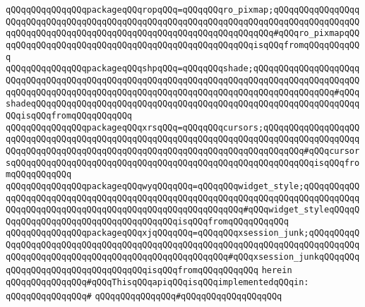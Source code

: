 \verb|qQQqqQQqqQQqqQQqpackageqQQqropqQQq=qQQqqQQqro_pixmap;qQQqqQQqqQQqqQQqqQQqqQQqqQQqqQQqqQQqqQQqqQQqqQQqqQQqqQQqqQQqqQQqqQQqqQQqqQQqqQQqqQQqqQQqqQQqqQQqqQQqqQQqqQQqqQQqqQQqqQQqqQQqqQQqqQQqqQQqqQQq#qQQqro_pixmapqQQqqQQqqQQqqQQqqQQqqQQqqQQqqQQqqQQqqQQqqQQqqQQqqQQqisqQQqfromqQQqqQQqqQQq|\newline
\verb|qQQqqQQqqQQqqQQqpackageqQQqshpqQQq=qQQqqQQqshade;qQQqqQQqqQQqqQQqqQQqqQQqqQQqqQQqqQQqqQQqqQQqqQQqqQQqqQQqqQQqqQQqqQQqqQQqqQQqqQQqqQQqqQQqqQQqqQQqqQQqqQQqqQQqqQQqqQQqqQQqqQQqqQQqqQQqqQQqqQQqqQQqqQQqqQQqqQQq#qQQqshadeqQQqqQQqqQQqqQQqqQQqqQQqqQQqqQQqqQQqqQQqqQQqqQQqqQQqqQQqqQQqqQQqqQQqisqQQqfromqQQqqQQqqQQq|\newline
\verb|qQQqqQQqqQQqqQQqpackageqQQqxrsqQQq=qQQqqQQqcursors;qQQqqQQqqQQqqQQqqQQqqQQqqQQqqQQqqQQqqQQqqQQqqQQqqQQqqQQqqQQqqQQqqQQqqQQqqQQqqQQqqQQqqQQqqQQqqQQqqQQqqQQqqQQqqQQqqQQqqQQqqQQqqQQqqQQqqQQqqQQqqQQqqQQq#qQQqcursorsqQQqqQQqqQQqqQQqqQQqqQQqqQQqqQQqqQQqqQQqqQQqqQQqqQQqqQQqqQQqisqQQqfromqQQqqQQqqQQq|\newline
\verb|qQQqqQQqqQQqqQQqpackageqQQqwyqQQqqQQq=qQQqqQQqwidget_style;qQQqqQQqqQQqqQQqqQQqqQQqqQQqqQQqqQQqqQQqqQQqqQQqqQQqqQQqqQQqqQQqqQQqqQQqqQQqqQQqqQQqqQQqqQQqqQQqqQQqqQQqqQQqqQQqqQQqqQQqqQQqqQQq#qQQqwidget_styleqQQqqQQqqQQqqQQqqQQqqQQqqQQqqQQqqQQqqQQqisqQQqfromqQQqqQQqqQQq|\newline
\verb|qQQqqQQqqQQqqQQqpackageqQQqxjqQQqqQQq=qQQqqQQqxsession_junk;qQQqqQQqqQQqqQQqqQQqqQQqqQQqqQQqqQQqqQQqqQQqqQQqqQQqqQQqqQQqqQQqqQQqqQQqqQQqqQQqqQQqqQQqqQQqqQQqqQQqqQQqqQQqqQQqqQQqqQQqqQQq#qQQqxsession_junkqQQqqQQqqQQqqQQqqQQqqQQqqQQqqQQqqQQqisqQQqfromqQQqqQQqqQQq|\newline
\verb|herein|\newline
\newline
\verb|qQQqqQQqqQQqqQQq#qQQqThisqQQqapiqQQqisqQQqimplementedqQQqin:|\newline
\verb|qQQqqQQqqQQqqQQq#|\newline
\verb|qQQqqQQqqQQqqQQq#qQQqqQQqqQQqqQQqqQQq|\newline
